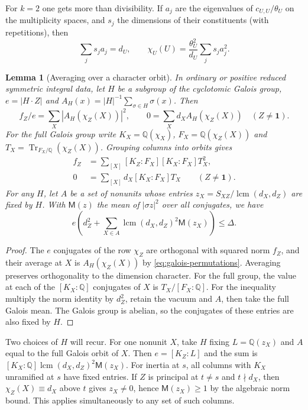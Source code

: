 \documentclass[11pt,a4paper]{article}
\numberwithin{equation}{section}
\newtheorem{lemma}[theorem]{Lemma}
\theoremstyle{remark}
\newcommand{\one}{\mathbf1}
\newcommand{\QQ}{\mathbb Q}
\newcommand{\Tr}{\operatorname{Tr}}
\newcommand{\lcm}{\operatorname{lcm}}
\begin{document}
For $k=2$ one gets more than divisibility. If $a_j$ are the eigenvalues of $c_{U,U}/\theta_U$ on the multiplicity spaces, and $s_j$ the dimensions of their constituents (with repetitions), then
\begin{equation}\label{eq:crosspair}
 \sum_j s_j a_j=d_U,\qquad
 \chi_U(U)=\frac{\theta_U^2}{d_U}\sum_j s_j a_j^2 .
\end{equation}

\begin{lemma}[Averaging over a character orbit]\label{fam:M:2.3}\label{deep:field-energy}\label{r8:trace-norm}\label{fam:Q:2.1}\label{fam:Q:n:q12:orbit}
In ordinary or positive reduced symmetric integral data, let $H$ be a subgroup of the cyclotomic Galois group, $e=|H\cdot Z|$ and $A_H(x)=|H|^{-1}\sum_{\sigma\in H}\sigma(x)$. Then
\[
  f_Z/e=\sum_X |A_H(\chi_Z(X))|^2,\qquad
  0=\sum_X d_X A_H(\chi_Z(X))\quad (Z\ne\one).
\]
For the full Galois group write $K_X=\QQ(\chi_X)$, $F_X=\QQ(\chi_Z(X))$ and $T_X=\Tr_{F_X/\QQ}(\chi_Z(X))$. Grouping columns into orbits gives
\begin{align}
 f_Z&=\sum_{[X]}[K_Z:F_X][K_X:F_X]T_X^2,\label{eq:r8-tracenorm}\\
 0&=\sum_{[X]}d_X[K_X:F_X]T_X\qquad(Z\ne\one).\label{eq:r8-tracedim}
\end{align}
For any $H$, let $A$ be a set of nonunits whose entries $z_X=S_{XZ}/\lcm(d_X,d_Z)$ are fixed by $H$. With $\mathsf M(z)$ the mean of $|\sigma z|^2$ over all conjugates, we have
\[
 e\left(d_Z^2+\sum_{X\in A}\lcm(d_X,d_Z)^2\mathsf M(z_X)\right)\le\Delta .
\]
\end{lemma}
\begin{proof}
The $e$ conjugates of the row $\chi_Z$ are orthogonal with squared norm $f_Z$, and their average at $X$ is $A_H(\chi_Z(X))$ by \eqref{eq:galois-permutations}. Averaging preserves orthogonality to the dimension character. For the full group, the value at each of the $[K_X:\QQ]$ conjugates of $X$ is $T_X/[F_X:\QQ]$. For the inequality multiply the norm identity by $d_Z^2$, retain the vacuum and $A$, then take the full Galois mean. The Galois group is abelian, so the conjugates of these entries are also fixed by $H$.
\end{proof}
Two choices of $H$ will recur. For one nonunit $X$, take $H$ fixing $L=\QQ(z_X)$ and $A$ equal to the full Galois orbit of $X$. Then $e=[K_Z:L]$ and the sum is $[K_X:\QQ]\lcm(d_X,d_Z)^2\mathsf M(z_X)$. For inertia at $s$, all columns with $K_X$ unramified at $s$ have fixed entries. If $Z$ is principal at $t\ne s$ and $t\nmid d_X$, then $\chi_Z(X)\equiv d_X$ above $t$ gives $z_X\ne0$, hence $\mathsf M(z_X)\ge1$ by the algebraic norm bound. This applies simultaneously to any set of such columns.
\end{document}
